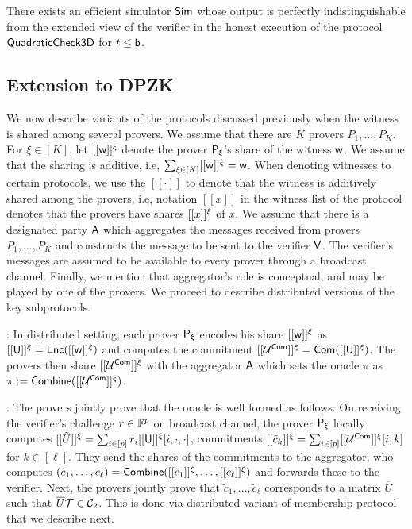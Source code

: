 \begin{lemma}\label{lem:simquadcheck}
There exists an efficient simulator $\mathsf{Sim}$ whose output is perfectly
indistinguishable from the extended view of the verifier in the honest execution
of the protocol $\mathsf{QuadraticCheck3D}$ for $t\leq \mathsf{b}$.
\end{lemma}


\subsection{Extension to DPZK}
We now describe variants of the protocols discussed previously when the witness
is shared among several provers. We assume that there are $K$ provers
$P_1,\ldots,P_K$. For $\xi\in [K]$, let $[[{\mathsf{w}}]]^\xi$ denote the prover
$\mathsf{P}_\xi$'s share of the witness $\mathsf{w}$. We assume that the sharing is additive,
i.e, $\sum_{\xi\in [K]}[[{\mathsf{w}}]]^\xi=\mathsf{w}$. When denoting witnesses to certain
protocols, we use the $[[\cdot]]$ to denote that the witness is additively
shared among the provers, i.e, notation $[[x]]$ in the witness list of the
protocol denotes that the provers have shares $[[{x}]]^\xi$ of $x$. We assume that
there is a designated party $\mathsf{A}$ which aggregates the messages received from
provers $P_1,\ldots,P_K$ and constructs the message to be sent to the verifier
$\mathsf{V}$. The verifier's  messages are assumed to be available to every
prover through a broadcast channel. Finally, we mention that aggregator's role
is conceptual, and may be played by one of the provers. We proceed to describe
distributed versions of the key subprotocols.

: In distributed setting, each prover
$\mathsf{P}_\xi$ encodes his share $[[{\mathsf{w}}]]^\xi$ as $[[{\mathsf{U}}]]^\xi=\mathsf{Enc}([[{\mathsf{w}}]]^\xi)$
and computes the commitment $[[{\mathcal{U}^{\mathsf{Com}}}]]^\xi=\mathsf{Com}([[{\mathsf{U}}]]^\xi)$. The provers
then share $[[{\mathcal{U}^{\mathsf{Com}}}]]^\xi$ with the aggregator $\mathsf{A}$ which sets the oracle
$\pi$ as $\pi := \mathsf{Combine}([[{\mathcal{U}^{\mathsf{Com}}}]]^\xi)$.  

: The provers jointly prove that 
the oracle is well formed as follows: On receiving the verifier’s challenge 
$r\in\mathbb{F}^p$ on broadcast channel, the prover $\mathsf{P}_\xi$ locally computes
$[[{\tilde{U}}]]^\xi=\sum_{i\in [p]}r_i[[{\mathsf{U}}]]^\xi[i,\cdot,\cdot]$, commitments
$[[{\tilde{c}_k}]]^\xi=\sum_{i\in [p]}[[{\mathcal{U}^{\mathsf{Com}}}]]^\xi[i,k]$ for $k\in [\ell]$. They
send the shares of the commitments to the aggregator, who computes
$(\tilde{c}_1,\ldots,\tilde{c}_\ell)=\mathsf{Combine}([[{\tilde{c}_1}]]^\xi,\ldots,[[{\tilde{c}_\ell}]]^\xi)$
and forwards these to the verifier. Next, the provers jointly prove that
$\tilde{c}_1,\ldots,\tilde{c}_\ell$ corresponds to a matrix $\overline{U}$ such
that $\overline{U}\mathcal{T}\in \mathcal{C}_2$. This is done via distributed variant of
membership protocol that we describe next.  

